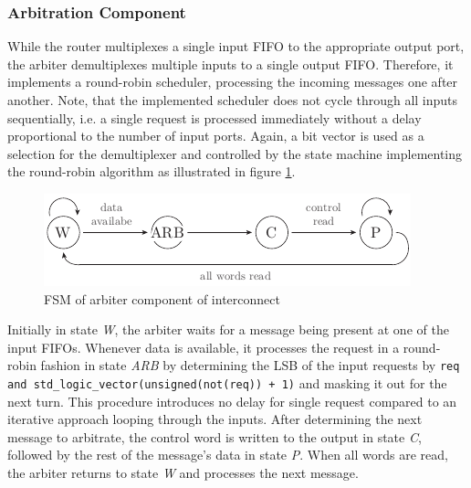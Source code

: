 \subsubsection{Arbitration Component}
While the router multiplexes a single input \ac{FIFO} to the appropriate
output port, the arbiter demultiplexes multiple inputs to a single output
\ac{FIFO}. Therefore, it implements a round-robin scheduler, processing the
incoming messages one after another. Note, that the implemented scheduler does
not cycle through all inputs sequentially, i.e. a single request is processed
immediately without a delay proportional to the number of input ports. Again,
a bit vector is used as a selection for the demultiplexer and controlled by
the state machine implementing the round-robin algorithm as illustrated in
figure \ref{fig:arbiter_fsm}.
\begin{figure}[tb]
	\centering
	\includegraphics{../figures/arbiter_fsm}
	\caption{\acs{FSM} of arbiter component of interconnect}
	\label{fig:arbiter_fsm}
\end{figure}
Initially in state \emph{W}, the arbiter waits for a message being present at
one of the input \acp{FIFO}. Whenever data is available, it processes the
request in a round-robin fashion in state \emph{ARB} by determining the
\ac{LSB} of the input requests by
\lstinline{req and std_logic_vector(unsigned(not(req)) + 1)} and masking it
out for the next turn. This procedure introduces no delay for single request
compared to an iterative approach looping through the inputs. After
determining the next message to arbitrate, the control word is written to the
output in state \emph{C}, followed by the rest of the message's data in state
\emph{P}. When all words are read, the arbiter returns to state \emph{W} and
processes the next message.

